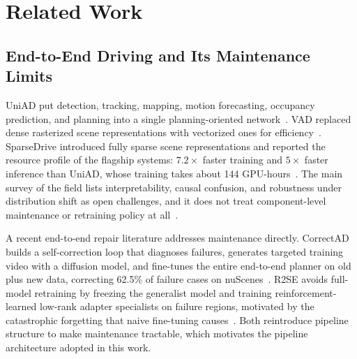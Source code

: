\documentclass[conference]{IEEEtran}
\begin{document}
\section{Related Work}
\label{sec:related}

\subsection{End-to-End Driving and Its Maintenance Limits}
UniAD put detection, tracking, mapping, motion forecasting, occupancy
prediction, and planning into a single planning-oriented
network~\cite{hu2023uniad}. VAD replaced dense rasterized scene
representations with vectorized ones for efficiency~\cite{jiang2023vad}.
SparseDrive introduced fully sparse scene representations and reported the
resource profile of the flagship systems: $7.2\times$ faster training and
$5\times$ faster inference than UniAD, whose training takes about 144
GPU-hours~\cite{sun2024sparsedrive}. The main survey of the field lists
interpretability, causal confusion, and robustness under distribution shift
as open challenges, and it does not treat component-level maintenance or
retraining policy at all~\cite{chen2024e2esurvey}.

A recent end-to-end repair literature addresses maintenance directly. CorrectAD
builds a self-correction loop that diagnoses failures, generates targeted
training video with a diffusion model, and fine-tunes the entire end-to-end planner
on old plus new data, correcting 62.5\% of failure cases on
nuScenes~\cite{ma2025correctad}. R2SE avoids full-model retraining by freezing
the generalist model and training reinforcement-learned low-rank adapter
specialists on failure regions, motivated by the catastrophic forgetting that
naive fine-tuning causes~\cite{liu2025r2se}. Both reintroduce pipeline structure
to make maintenance tractable, which motivates the pipeline architecture adopted
in this work.
\end{document}
